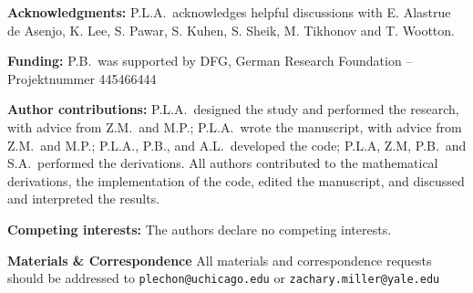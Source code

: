 \documentclass[
 reprint,
 amsmath,
 amssymb,
 aps,
 superscriptaddress,
]{revtex4-2}
\begin{document}



\vspace{2pt}
\noindent \textbf{Acknowledgments:}
P.L.A.\ acknowledges helpful discussions 
with E. Alastrue de Asenjo, K. Lee, S. Pawar, S. Kuhen, S. Sheik, M. Tikhonov and T. Wootton.

\noindent \textbf{Funding:}
P.B.\ was supported by DFG, German Research Foundation – Projektnummer 445466444

\enlargethispage{4\baselineskip}
\noindent \textbf{Author contributions:}
P.L.A.\ designed the study and performed the research, with advice from Z.M.\ and M.P.; P.L.A.\ wrote the manuscript, with advice from Z.M.\ and M.P.; P.L.A., P.B., and A.L.\ developed the code; P.L.A, Z.M, P.B.\ and S.A.\ performed the derivations. All authors contributed to the mathematical derivations, the implementation of the code, edited the manuscript, and discussed and interpreted the results.

\noindent \textbf{Competing interests:}
The authors declare no competing interests.

\noindent \textbf{Materials \& Correspondence}
All materials and correspondence requests should be addressed to \texttt{plechon@uchicago.edu} or \texttt{zachary.miller@yale.edu}
\end{document}
